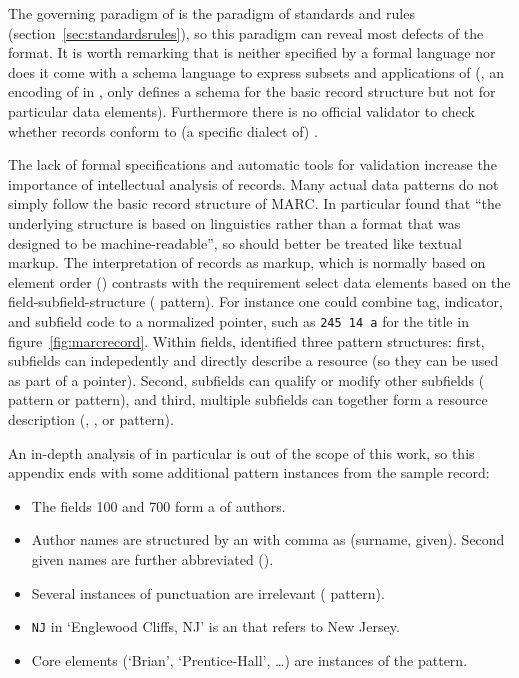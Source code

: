The governing paradigm of  is the paradigm of standards and rules
(section~\ref{sec:standardsrules}), so this paradigm can reveal most defects of
the format. It is worth remarking that  is neither specified by a
formal language nor does it come with a schema language to express subsets and
applications of  (, an encoding of  in
, only defines a schema for the basic record structure but not for
particular data elements). Furthermore there is no official validator to check
whether records conform to (a specific dialect of) .

The lack of formal specifications and automatic tools for validation increase
the importance of intellectual analysis of  records. Many actual
data patterns do not simply follow the basic record structure of MARC. In
particular \textcite{Thomale2010} found that ``the underlying structure is
based on linguistics rather than a format that was designed to be
machine-readable'', so  should better be treated like textual
markup. The interpretation of records as markup, which is normally based on
element order () contrasts with the requirement select data
elements based on the field-subfield-structure ( pattern).
For instance one could combine tag, indicator, and subfield code to a
normalized pointer, such as \texttt{245 14 a} for the title in
figure~\ref{fig:marcrecord}.  Within  fields, \textcite{Coyle2011}
identified three pattern structures: first, subfields can indepedently and
directly describe a resource (so they can be used as part of a pointer).
Second, subfields can qualify or modify other subfields (
pattern or  pattern), and third, multiple subfields can together
form a resource description (, , or
 pattern). 

An in-depth analysis of  in particular is out of the scope of this
work, so this appendix ends with some additional pattern instances from the
sample record:


\begin{itemize}
\item The fields 100 and 700 form a  of authors.
\item Author names are structured by an  with comma as 
   (surname, given). Second given names are further abbreviated
  ().
\item Several instances of punctuation are irrelevant ( pattern).
\item \texttt{NJ} in `Englewood Cliffs, NJ' is an  that refers 
	to New Jersey.
\item Core elements (`Brian', `Prentice-Hall', \ldots) are instances of
	the  pattern.
\end{itemize}


